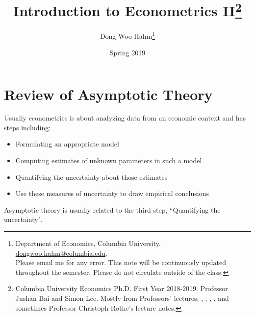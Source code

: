 \documentclass[11pt]{article} %
\title{Introduction to Econometrics II\thanks{Columbia University Economics Ph.D. First Year 2018-2019. Professor Jushan Bai and Simon Lee. Mostly from Professors' lectures, \cite{hanseneconometrics}, \cite{cameronandtrivedi}, \cite{mostlyharmless}, \cite{wooldridgepanel},  and sometimes Professor Christoph Rothe's lecture notes.}}
\author{Dong Woo Hahm\thanks{Department of Economics, Columbia University. \href{mailto:dongwoo.hahm@columbia.edu}{dongwoo.hahm@columbia.edu}. \\Please email me for any error. This note will be continuously updated throughout the semester. Please do not circulate outside of the class.}}
\date{Spring 2019} %
\theoremstyle{definition}
\numberwithin{defn}{subsection}
\numberwithin{thm}{subsection}
\numberwithin{ex}{subsection}
\begin{document}
\maketitle
\tableofcontents
\clearpage
\section{Review of Asymptotic Theory}
\noindent Usually econometrics is about analyzing data from an economic context and has steps including:
\begin{itemize}
\item Formulating an appropriate model
\item Computing estimates of unknown parameters in such a model
\item Quantifying the uncertainty about those estimates
\item Use these measures of uncertainty to draw empirical conclusions
\end{itemize}
Asymptotic theory is usually related to the third step, ``Quantifying the uncertainty".
\end{document}
